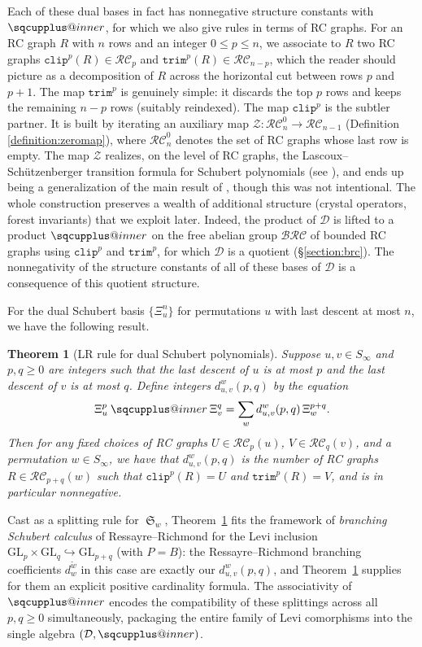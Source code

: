 \documentclass{amsart}
\makeatletter
\newcommand{\sqcupplus@inner}[2]{%
  \vcenter{\hbox{\ooalign{%
    \hfil$\m@th#1\sqcup$\hfil\cr
    \hfil\raisebox{0.15ex}{$\m@th#1\scriptscriptstyle+$}\hfil\cr
  }}}%
}
\newcommand{\sqcupplus}{\mathbin{\mathpalette\sqcupplus@inner\relax}}
\newtheorem{theorem}{Theorem}[section]
\theoremstyle{definition}
\theoremstyle{remark}
\numberwithin{equation}{subsection}
\DeclareMathOperator{\sch}{\mathfrak{S}}
\newcommand{\trm}{\mathtt{trim}}
\newcommand{\zeromap}{\mathcal{Z}}
\newcommand{\clp}{\mathtt{clip}}
\newcommand{\BRC}{\mathcal{BRC}}
\newcommand{\RC}{\mathcal{RC}}
\newcommand{\dsch}{\ensuremath{\Xi}}
\newcommand{\dcoma}{\mathcal{D}}
\makeatother
\begin{document}
Each of these dual bases in fact has nonnegative structure constants with $\sqcupplus$, for which we also give rules in terms of RC graphs. For an RC graph $R$ with $n$ rows and an integer $0\leq p\leq n$, we associate to $R$ two RC graphs $\clp^p(R)\in\RC_p$ and $\trm^p(R)\in\RC_{n-p}$, which the reader should picture as a decomposition of $R$ across the horizontal cut between rows $p$ and $p+1$. The map $\trm^p$ is genuinely simple: it discards the top $p$ rows and keeps the remaining $n-p$ rows (suitably reindexed). The map $\clp^p$ is the subtler partner. It is built by iterating an auxiliary map $\zeromap:\RC_n^0\to\RC_{n-1}$ (Definition \ref{definition:zeromap}), where $\RC_n^0$ denotes the set of RC graphs whose last row is empty. The map $\zeromap$ realizes, on the level of RC graphs, the Lascoux--Schützenberger transition formula for Schubert polynomials (see \cite{notes}), and ends up being a generalization of the main result of \cite{little2003combinatorial}, though this was not intentional. The whole construction preserves a wealth of additional structure (crystal operators, forest invariants) that we exploit later. Indeed, the product of $\dcoma$ is lifted to a product $\sqcupplus$ on the free abelian group $\BRC$ of bounded RC graphs using $\clp^p$ and $\trm^p$, for which $\dcoma$ is a quotient (\S\ref{section:brc}). The nonnegativity of the structure constants of all of these bases of $\dcoma$ is a consequence of this quotient structure.

For the dual Schubert basis $\{\dsch_u^n\}$ for permutations $u$ with last descent at most $n$, we have the following result.

\begin{theorem}[LR rule for dual Schubert polynomials]\label{theorem:LR}
Suppose $u,v\in S_\infty$ and $p,q\geq 0$ are integers such that the last descent of $u$ is at most $p$ and the last descent of $v$ is at most $q$. Define integers $d_{u,v}^w(p, q)$ by the equation
$$\dsch_u^p \sqcupplus \dsch_v^q = \sum_{w} d_{u,v}^w(p, q)\,\dsch_w^{p+q}.$$
Then for any fixed choices of RC graphs $U\in \RC_p(u)$, $V\in\RC_q(v)$, and a permutation $w\in S_\infty$, we have that $d_{u, v}^w(p, q)$ is the number of RC graphs $R\in \RC_{p+q}(w)$ such that $\clp^p(R)=U$ and $\trm^p(R)=V$, and is in particular nonnegative.
\end{theorem}
Cast as a splitting rule for $\sch_w$, Theorem~\ref{theorem:LR} fits the framework of \emph{branching Schubert calculus} of Ressayre--Richmond \cite{ressayre2009branching} for the Levi inclusion $\mathrm{GL}_p\times \mathrm{GL}_q\hookrightarrow \mathrm{GL}_{p+q}$ (with $P=B$): the Ressayre--Richmond branching coefficients $d_w^{\tilde w}$ in this case are exactly our $d_{u,v}^w(p,q)$, and Theorem~\ref{theorem:LR} supplies for them an explicit positive cardinality formula. The associativity of $\sqcupplus$ encodes the compatibility of these splittings across all $p,q\geq 0$ simultaneously, packaging the entire family of Levi comorphisms into the single algebra $(\dcoma,\sqcupplus)$.
\end{document}
